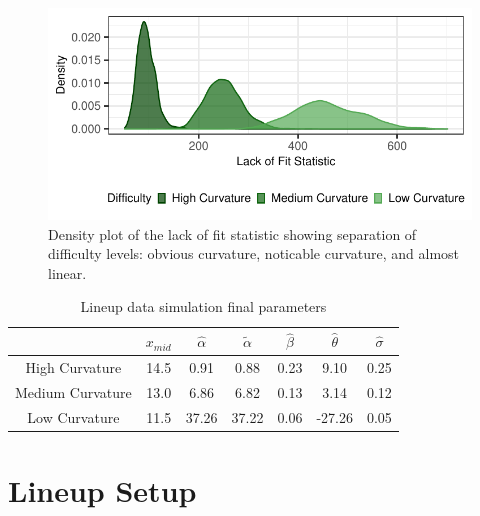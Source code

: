 \documentclass[12pt]{article}
\begin{document}
\begin{figure}[tbp]

{\centering \includegraphics[width=1\linewidth,]{logarithmic-lineups_files/figure-latex/lof-density-curves-1} 

}

\caption[Lineup parameter selection]{Density plot of the lack of fit statistic showing separation of difficulty levels: obvious curvature, noticable curvature, and almost linear.}\label{fig:lof-density-curves}
\end{figure}

\begin{table}

\caption{\label{tab:parameter-data}Lineup data simulation final parameters}
\centering
\begin{tabular}[t]{ccccccc}
\toprule
 & $x_{mid}$ & $\hat\alpha$ & $\tilde\alpha$ & $\hat\beta$ & $\hat\theta$ & $\hat\sigma$\\
\midrule
High Curvature & 14.5 & 0.91 & 0.88 & 0.23 & 9.10 & 0.25\\
Medium Curvature & 13.0 & 6.86 & 6.82 & 0.13 & 3.14 & 0.12\\
Low Curvature & 11.5 & 37.26 & 37.22 & 0.06 & -27.26 & 0.05\\
\bottomrule
\end{tabular}
\end{table}

\hypertarget{lineup-setup}{%
\section{Lineup Setup}\label{lineup-setup}}
\end{document}
